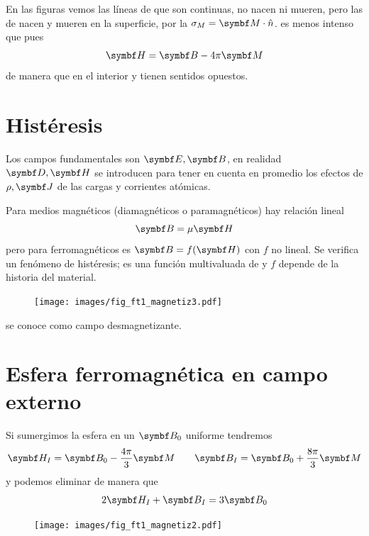 \documentclass[10pt,oneside]{CBFT_book}
\begin{document}
En las figuras vemos las líneas de  que son continuas, no nacen ni mueren, pero las
de  nacen y mueren en la superficie, por la $\sigma_M = \vb{M}\cdot\hat{n}$.
 es menos intenso que  pues
\[
	\vb{H} = \vb{B} - 4\pi \vb{M}
\]
de manera que en el interior  y  tienen sentidos opuestos.

\section{Histéresis}

Los campos fundamentales son $\vb{E},\vb{B}$, en realidad $\vb{D},\vb{H}$ se introducen para tener
en cuenta en promedio los efectos de $\rho, \vb{J}$ de las cargas y corrientes atómicas.

Para medios magnéticos (diamagnéticos o paramagnéticos) hay relación lineal
\[
	\vb{B} = \mu \vb{H}
\]
pero para ferromagnéticos es $\vb{B} = f(\vb{H})$ con $f$ no lineal. Se verifica un fenómeno
de histéresis;  es una función multivaluada de  y $f$ depende de la historia del material.

\begin{figure}[htb]
	\begin{center}
	\texttt{[image: images/fig\_ft1\_magnetiz3.pdf]}	 
	\end{center}
	\caption{}
\end{figure} 

 se conoce como campo desmagnetizante.


\section{Esfera ferromagnética en campo externo}

Si sumergimos la esfera en un $\vb{B}_0$ uniforme tendremos
\[
	\vb{H}_I = \vb{B}_0 - \frac{4\pi}{3} \vb{M} \qquad \vb{B}_I = \vb{B}_0 + \frac{8\pi}{3} \vb{M}
\]
y podemos eliminar  de manera que 
\[
	2\vb{H}_I + \vb{B}_I = 3\vb{B}_0
\]

\begin{figure}[htb]
	\begin{center}
	\texttt{[image: images/fig\_ft1\_magnetiz2.pdf]}	 
	\end{center}
	\caption{}
\end{figure} 
\end{document}
